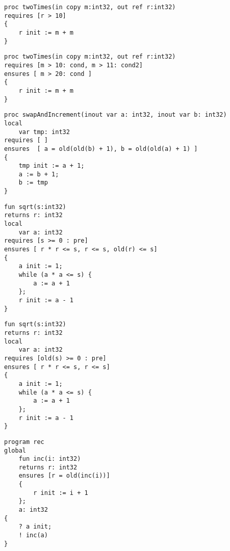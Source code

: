 \begin{lstlisting}[caption=Fehler: Zugriff auf out Parameter in precondition.]
proc twoTimes(in copy m:int32, out ref r:int32)
requires [r > 10]
{
    r init := m + m
}
\end{lstlisting}

\begin{lstlisting}[caption=Fehler: Gleiche Labels in Conditions derselben Routine.]
proc twoTimes(in copy m:int32, out ref r:int32)
requires [m > 10: cond, m > 11: cond2]
ensures [ m > 20: cond ]
{
    r init := m + m
}
\end{lstlisting}

\begin{lstlisting}[caption=Fehler: Auf die Funktion old darf im preexecution State nicht zugegriffen werden.]
proc swapAndIncrement(inout var a: int32, inout var b: int32)
local 
    var tmp: int32
requires [ ]
ensures  [ a = old(old(b) + 1), b = old(old(a) + 1) ]
{
    tmp init := a + 1;
    a := b + 1;
    b := tmp
}

\end{lstlisting}
                                                                         
\begin{lstlisting}[caption=Fehler: Zugriff auf uninitialisierter Wert in preexecution State mittels old]
fun sqrt(s:int32)
returns r: int32
local 
    var a: int32
requires [s >= 0 : pre]
ensures [ r * r <= s, r <= s, old(r) <= s]
{
    a init := 1;
    while (a * a <= s) {
        a := a + 1
    };      
    r init := a - 1
}
\end{lstlisting}


\begin{lstlisting}[caption=Fehler: Zugriff auf Funktion old in precondition]
fun sqrt(s:int32)
returns r: int32
local 
    var a: int32
requires [old(s) >= 0 : pre]
ensures [ r * r <= s, r <= s]
{
    a init := 1;
    while (a * a <= s) {
        a := a + 1
    };      
    r init := a - 1
}
\end{lstlisting}

\begin{lstlisting}[caption=Fehler: Rekursiver Aufruf in condition.]
program rec
global
    fun inc(i: int32)
    returns r: int32
    ensures [r = old(inc(i))]
    {
        r init := i + 1
    };
    a: int32
{
    ? a init;
    ! inc(a)    
}
\end{lstlisting}

